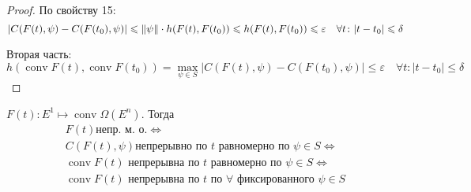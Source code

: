 \begin{proof}
    По свойству 15:
    \begin{equation*}
        |C(F(t), \psi) - C(F(t_0), \psi)| \leqslant \lVert \psi \rVert \cdot h(F(t), F(t_0)) \leqslant h(F(t), F(t_0)) \leqslant \varepsilon \quad \forall t\colon |t - t_0| \leqslant \delta
    \end{equation*}


    Вторая часть:
    \begin{equation*}
        h(\operatorname{conv}F(t), \operatorname{conv}F(t_0)) = \max\limits_{\psi \in S}|C(F(t), \psi) - C(F(t_0), \psi)| \leqslant \varepsilon \quad \forall t\colon |t - t_0| \leqslant \delta
    \end{equation*}
\end{proof}

\begin{crlr}
    $F(t)\colon E^1 \mapsto \operatorname{conv}\Omega(E^n)$.
    Тогда 
    \begin{multline*}
        F(t) \text{непр. м. о.} \iff \\
        C(F(t), \psi) \text{непрерывно по } t \text{ равномерно по } \psi \in S \iff \\
        \operatorname{conv} F(t) \text{ непрерывна по } t \text{ равномерно по } \psi \in S \iff \\
        \operatorname{conv} F(t) \text{ непрерывна по } t \text{ по } \forall \text{ фиксированного }\psi \in S
    \end{multline*}
\end{crlr}

